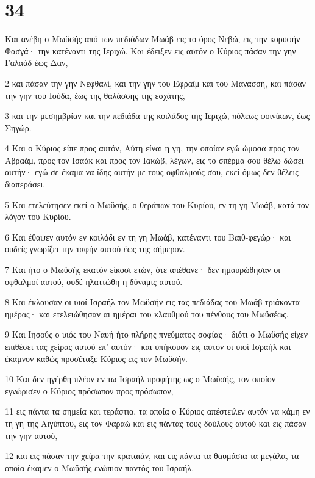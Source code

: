 \chapter{34}

\par Και ανέβη ο Μωϋσής από των πεδιάδων Μωάβ εις το όρος Νεβώ, εις την κορυφήν Φασγά· την κατέναντι της Ιεριχώ. Και έδειξεν εις αυτόν ο Κύριος πάσαν την γην Γαλαάδ έως Δαν,
\par 2 και πάσαν την γην Νεφθαλί, και την γην του Εφραΐμ και του Μανασσή, και πάσαν την γην του Ιούδα, έως της θαλάσσης της εσχάτης,
\par 3 και την μεσημβρίαν και την πεδιάδα της κοιλάδος της Ιεριχώ, πόλεως φοινίκων, έως Σηγώρ.
\par 4 Και ο Κύριος είπε προς αυτόν, Αύτη είναι η γη, την οποίαν εγώ ώμοσα προς τον Αβραάμ, προς τον Ισαάκ και προς τον Ιακώβ, λέγων, εις το σπέρμα σου θέλω δώσει αυτήν· εγώ σε έκαμα να ίδης αυτήν με τους οφθαλμούς σου, εκεί όμως δεν θέλεις διαπεράσει.
\par 5 Και ετελεύτησεν εκεί ο Μωϋσής, ο θεράπων του Κυρίου, εν τη γη Μωάβ, κατά τον λόγον του Κυρίου.
\par 6 Και έθαψεν αυτόν εν κοιλάδι εν τη γη Μωάβ, κατέναντι του Βαιθ-φεγώρ· και ουδείς γνωρίζει την ταφήν αυτού έως της σήμερον.
\par 7 Και ήτο ο Μωϋσής εκατόν είκοσι ετών, ότε απέθανε· δεν ημαυρώθησαν οι οφθαλμοί αυτού, ουδέ ηλαττώθη η δύναμις αυτού.
\par 8 Και έκλαυσαν οι υιοί Ισραήλ τον Μωϋσήν εις τας πεδιάδας του Μωάβ τριάκοντα ημέρας· και ετελειώθησαν αι ημέραι του κλαυθμού του πένθους του Μωϋσέως.
\par 9 Και Ιησούς ο υιός του Ναυή ήτο πλήρης πνεύματος σοφίας· διότι ο Μωϋσής είχεν επιθέσει τας χείρας αυτού επ' αυτόν· και υπήκουον εις αυτόν οι υιοί Ισραήλ και έκαμνον καθώς προσέταξε Κύριος εις τον Μωϋσήν.
\par 10 Και δεν ηγέρθη πλέον εν τω Ισραήλ προφήτης ως ο Μωϋσής, τον οποίον εγνώρισεν ο Κύριος πρόσωπον προς πρόσωπον,
\par 11 εις πάντα τα σημεία και τεράστια, τα οποία ο Κύριος απέστειλεν αυτόν να κάμη εν τη γη της Αιγύπτου, εις τον Φαραώ και εις πάντας τους δούλους αυτού και εις πάσαν την γην αυτού,
\par 12 και εις πάσαν την χείρα την κραταιάν, και εις πάντα τα θαυμάσια τα μεγάλα, τα οποία έκαμεν ο Μωϋσής ενώπιον παντός του Ισραήλ.


